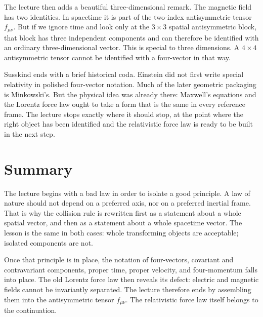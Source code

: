 The lecture then adds a beautiful three-dimensional remark. The magnetic field has two identities. In spacetime it is part of the two-index antisymmetric tensor \(f_{\mu\nu}\). But if we ignore time and look only at the \(3\times3\) spatial antisymmetric block, that block has three independent components and can therefore be identified with an ordinary three-dimensional vector. This is special to three dimensions. A \(4\times4\) antisymmetric tensor cannot be identified with a four-vector in that way.

Susskind ends with a brief historical coda. Einstein did not first write special relativity in polished four-vector notation. Much of the later geometric packaging is Minkowski's. But the physical idea was already there: Maxwell's equations and the Lorentz force law ought to take a form that is the same in every reference frame. The lecture stops exactly where it should stop, at the point where the right object has been identified and the relativistic force law is ready to be built in the next step.

\section{Summary}

The lecture begins with a bad law in order to isolate a good principle. A law of nature should not depend on a preferred axis, nor on a preferred inertial frame. That is why the collision rule is rewritten first as a statement about a whole spatial vector, and then as a statement about a whole spacetime vector. The lesson is the same in both cases: whole transforming objects are acceptable; isolated components are not.

Once that principle is in place, the notation of four-vectors, covariant and contravariant components, proper time, proper velocity, and four-momentum falls into place. The old Lorentz force law then reveals its defect: electric and magnetic fields cannot be invariantly separated. The lecture therefore ends by assembling them into the antisymmetric tensor \(f_{\mu\nu}\). The relativistic force law itself belongs to the continuation.